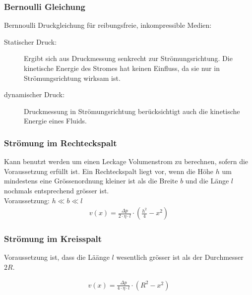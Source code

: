 \subsubsection{Bernoulli Gleichung}
Bernnoulli Druckgleichung für reibungsfreie, inkompressible Medien:

\begin{description}
\item[Statischer Druck:] Ergibt sich aus Druckmessung senkrecht zur Strömungsrichtung. Die kinetische Energie des Stromes hat keinen Einfluss, da sie nur in Strömungsrichtung wirksam ist.
\item[dynamischer Druck:] Druckmessung in Strömungsrichtung berücksichtigt auch die kinetische Energie eines Fluids. 
\end{description}





\subsubsection{Strömung im Rechteckspalt}
Kann benutzt werden um einen Leckage Volumenstrom zu berechnen, sofern die Voraussetzung erfüllt ist. Ein Rechteckspalt liegt vor, wenn die Höhe $h$ um mindestens eine Grössenordnung kleiner ist als die Breite $b$ und die Länge $l$ nochmals entsprechend grösser ist. \\


Voraussetzung: $h \ll b \ll l$ \\


\begin{align*}
v(x) = \frac{\Delta p}{2 \cdot \eta \cdot l} \cdot ( \frac{h^2}{4} - x^2)
\end{align*}



\subsubsection{Strömung im Kreisspalt}
Voraussetzung ist, dass die Läänge $l$ wesentlich grösser ist als der Durchmesser $2R$.
 
\begin{align*}
v(x) = \frac{\Delta p}{4 \cdot \eta \cdot l} \cdot (R^2 - x^2)
\end{align*}

